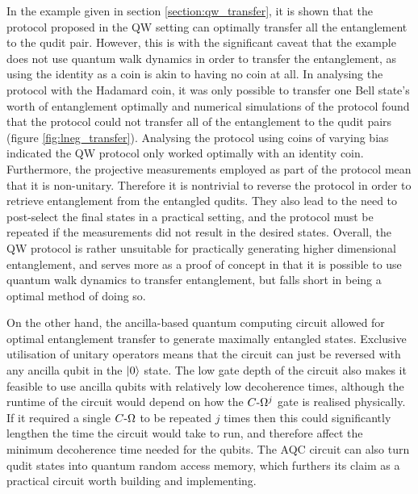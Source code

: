 In the example given in section \ref{section:qw_transfer}, it is shown that the protocol proposed in the QW setting can optimally transfer all the entanglement to the qudit pair.
However, this is with the significant caveat that the example does not use quantum walk dynamics in order to transfer the entanglement, as using the identity as a coin is akin to having no coin at all.
In analysing the protocol with the Hadamard coin, it was only possible to transfer one Bell state's worth of entanglement optimally and numerical simulations of the protocol found that the protocol could not transfer all of the entanglement to the qudit pairs (figure \ref{fig:lneg_transfer}).
Analysing the protocol using coins of varying bias indicated the QW protocol only worked optimally with an identity coin.
Furthermore, the projective measurements employed as part of the protocol mean that it is non-unitary.
Therefore it is nontrivial to reverse the protocol in order to retrieve entanglement from the entangled qudits.
They also lead to the need to post-select the final states in a practical setting, and the protocol must be repeated if the measurements did not result in the desired states.
Overall, the QW protocol is rather unsuitable for practically generating higher dimensional entanglement, and serves more as a proof of concept in that it is possible to use quantum walk dynamics to transfer entanglement, but falls short in being a optimal method of doing so.

On the other hand, the ancilla-based quantum computing circuit allowed for optimal entanglement transfer to generate maximally entangled states.
Exclusive utilisation of unitary operators means that the circuit can just be reversed with any ancilla qubit in the $\ket{0}$ state.
The low gate depth of the circuit also makes it feasible to use ancilla qubits with relatively low decoherence times, although the runtime of the circuit would depend on how the $C\text{-}\Omega^j$ gate is realised physically.
If it required a single $C\text{-}\Omega$ to be repeated $j$ times then this could significantly lengthen the time the circuit would take to run, and therefore affect the minimum decoherence time needed for the qubits.
The AQC circuit can also turn qudit states into quantum random access memory, which furthers its claim as a practical circuit worth building and implementing.

